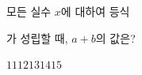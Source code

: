 모든 실수 $x$에 대하여 등식\par\smallskip{}\par\smallskip\noindent 가 성립할 때, $a+b$의 값은? 
\begin{choices32}{$11$}{$12$}{$13$}{$14$}{$15$}\end{choices32}
